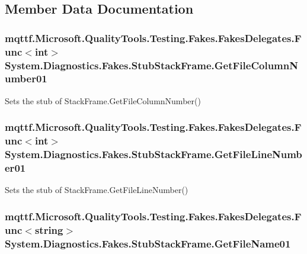 \subsection{Member Data Documentation}
\hypertarget{class_system_1_1_diagnostics_1_1_fakes_1_1_stub_stack_frame_a60950a4f8ed32ac55bca4538b0e63852}{
\subsubsection[{Get\-File\-Column\-Number01}]{\setlength{\rightskip}{0pt plus 5cm}mqttf.\-Microsoft.\-Quality\-Tools.\-Testing.\-Fakes.\-Fakes\-Delegates.\-Func$<$int$>$ System.\-Diagnostics.\-Fakes.\-Stub\-Stack\-Frame.\-Get\-File\-Column\-Number01}}\label{class_system_1_1_diagnostics_1_1_fakes_1_1_stub_stack_frame_a60950a4f8ed32ac55bca4538b0e63852}


Sets the stub of Stack\-Frame.\-Get\-File\-Column\-Number()

\hypertarget{class_system_1_1_diagnostics_1_1_fakes_1_1_stub_stack_frame_a73bba9693e621f7edf1dd26b0e32291a}{
\subsubsection[{Get\-File\-Line\-Number01}]{\setlength{\rightskip}{0pt plus 5cm}mqttf.\-Microsoft.\-Quality\-Tools.\-Testing.\-Fakes.\-Fakes\-Delegates.\-Func$<$int$>$ System.\-Diagnostics.\-Fakes.\-Stub\-Stack\-Frame.\-Get\-File\-Line\-Number01}}\label{class_system_1_1_diagnostics_1_1_fakes_1_1_stub_stack_frame_a73bba9693e621f7edf1dd26b0e32291a}


Sets the stub of Stack\-Frame.\-Get\-File\-Line\-Number()

\hypertarget{class_system_1_1_diagnostics_1_1_fakes_1_1_stub_stack_frame_a7b75638e8b38727f48be4a17c6ba6b0c}{
\subsubsection[{Get\-File\-Name01}]{\setlength{\rightskip}{0pt plus 5cm}mqttf.\-Microsoft.\-Quality\-Tools.\-Testing.\-Fakes.\-Fakes\-Delegates.\-Func$<$string$>$ System.\-Diagnostics.\-Fakes.\-Stub\-Stack\-Frame.\-Get\-File\-Name01}}\label{class_system_1_1_diagnostics_1_1_fakes_1_1_stub_stack_frame_a7b75638e8b38727f48be4a17c6ba6b0c}


